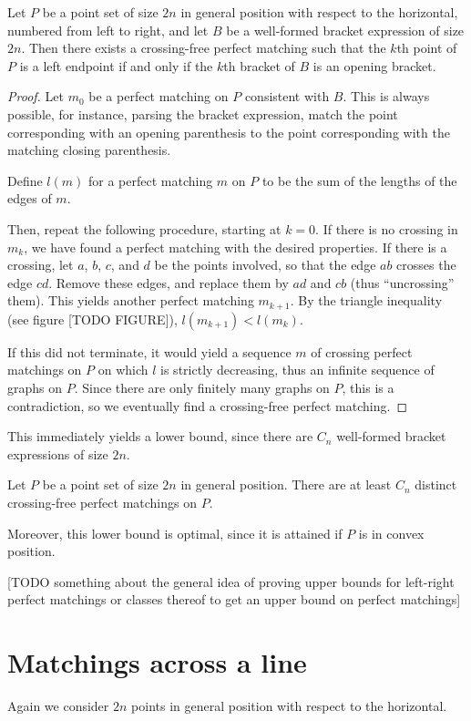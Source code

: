 \documentclass[10pt, a4paper, twoside]{basestyle}
\begin{document}
\begin{theorem}
Let $P$ be a point set of size $2n$ in general position with respect to the horizontal,
numbered from left to right, and let $B$ be a well-formed bracket expression of size $2n$.
Then there exists a crossing-free perfect matching such that the $k$th point of $P$ is a left
endpoint if and only if the $k$th bracket of $B$ is an opening bracket.
\begin{proof}
Let $m_0$ be a perfect matching on $P$ consistent with $B$. This is always possible, for instance,
parsing the bracket expression, match the point corresponding with an opening parenthesis
to the point corresponding with the matching closing parenthesis.

Define $l(m)$ for a perfect matching $m$ on $P$ to be the sum of the lengths of the edges of $m$.

Then, repeat the following procedure, starting at $k=0$.
If there is no crossing in $m_k$, we have found a perfect matching with the desired properties.
If there is a crossing, let $a$, $b$, $c$, and $d$ be the points involved, so that the edge
$ab$ crosses the edge $cd$. Remove these edges, and replace them by $ad$ and $cb$
(thus ``uncrossing'' them). This yields another perfect matching $m_{k+1}$. By the triangle
inequality (see figure [TODO FIGURE]), $l(m_{k+1})<l(m_k)$. 

If this did not terminate, it would yield a sequence $m$ of crossing perfect matchings on $P$ on
which $l$ is strictly decreasing, thus an infinite sequence of graphs on $P$.
Since there are only finitely many graphs on $P$, this is a contradiction, so we eventually find a
crossing-free perfect matching.
\end{proof}
\end{theorem}
This immediately yields a lower bound, since there are $C_n$ well-formed bracket expressions
of size $2n$.
\begin{corollary}
Let $P$ be a point set of size $2n$ in general position. There are at least $C_n$ distinct
crossing-free perfect matchings on $P$.
\end{corollary}
Moreover, this lower bound is optimal, since it is attained if $P$ is in convex position.

[TODO something about the general idea of proving upper bounds for left-right perfect matchings or
classes thereof to get an upper bound on perfect matchings]

\section{Matchings across a line}
Again we consider $2n$ points in general position with respect to the horizontal.
\end{document}
